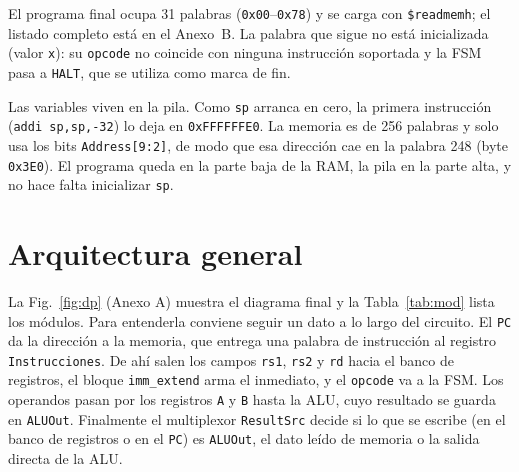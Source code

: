 \documentclass[conference]{IEEEtran}
\newcommand{\cod}[1]{\texttt{\small #1}}
\begin{document}
El programa final ocupa 31 palabras (\cod{0x00}--\cod{0x78}) y se carga con \cod{\$readmemh}; el listado completo está en el Anexo~B. La palabra que sigue no está inicializada (valor \cod{x}): su \cod{opcode} no coincide con ninguna instrucción soportada y la FSM pasa a \cod{HALT}, que se utiliza como marca de fin.

Las variables viven en la pila. Como \cod{sp} arranca en cero, la primera instrucción (\cod{addi sp,sp,-32}) lo deja en \cod{0xFFFFFFE0}. La memoria es de 256 palabras y solo usa los bits \cod{Address[9:2]}, de modo que esa dirección cae en la palabra 248 (byte \cod{0x3E0}). El programa queda en la parte baja de la RAM, la pila en la parte alta, y no hace falta inicializar \cod{sp}.

\section{Arquitectura general}
La Fig.~\ref{fig:dp} (Anexo A) muestra el diagrama final y la Tabla~\ref{tab:mod} lista los módulos. Para entenderla conviene seguir un dato a lo largo del circuito. El \cod{PC} da la dirección a la memoria, que entrega una palabra de instrucción al registro \cod{Instrucciones}. De ahí salen los campos \cod{rs1}, \cod{rs2} y \cod{rd} hacia el banco de registros, el bloque \cod{imm\_extend} arma el inmediato, y el \cod{opcode} va a la FSM. Los operandos pasan por los registros \cod{A} y \cod{B} hasta la ALU, cuyo resultado se guarda en \cod{ALUOut}. Finalmente el multiplexor \cod{ResultSrc} decide si lo que se escribe (en el banco de registros o en el \cod{PC}) es \cod{ALUOut}, el dato leído de memoria o la salida directa de la ALU.
\end{document}
